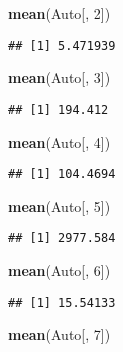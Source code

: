 \documentclass[
]{article}
\newenvironment{Shaded}{\begin{snugshade}}{\end{snugshade}}
\newcommand{\DecValTok}[1]{\textcolor[rgb]{0.00,0.00,0.81}{#1}}
\newcommand{\FunctionTok}[1]{\textcolor[rgb]{0.13,0.29,0.53}{\textbf{#1}}}
\newcommand{\NormalTok}[1]{#1}
\begin{document}
\begin{Shaded}
\begin{Highlighting}[]
\FunctionTok{mean}\NormalTok{(Auto[, }\DecValTok{2}\NormalTok{])}
\end{Highlighting}
\end{Shaded}

\begin{verbatim}
## [1] 5.471939
\end{verbatim}

\begin{Shaded}
\begin{Highlighting}[]
\FunctionTok{mean}\NormalTok{(Auto[, }\DecValTok{3}\NormalTok{])}
\end{Highlighting}
\end{Shaded}

\begin{verbatim}
## [1] 194.412
\end{verbatim}

\begin{Shaded}
\begin{Highlighting}[]
\FunctionTok{mean}\NormalTok{(Auto[, }\DecValTok{4}\NormalTok{])}
\end{Highlighting}
\end{Shaded}

\begin{verbatim}
## [1] 104.4694
\end{verbatim}

\begin{Shaded}
\begin{Highlighting}[]
\FunctionTok{mean}\NormalTok{(Auto[, }\DecValTok{5}\NormalTok{])}
\end{Highlighting}
\end{Shaded}

\begin{verbatim}
## [1] 2977.584
\end{verbatim}

\begin{Shaded}
\begin{Highlighting}[]
\FunctionTok{mean}\NormalTok{(Auto[, }\DecValTok{6}\NormalTok{])}
\end{Highlighting}
\end{Shaded}

\begin{verbatim}
## [1] 15.54133
\end{verbatim}

\begin{Shaded}
\begin{Highlighting}[]
\FunctionTok{mean}\NormalTok{(Auto[, }\DecValTok{7}\NormalTok{])}
\end{Highlighting}
\end{Shaded}
\end{document}
